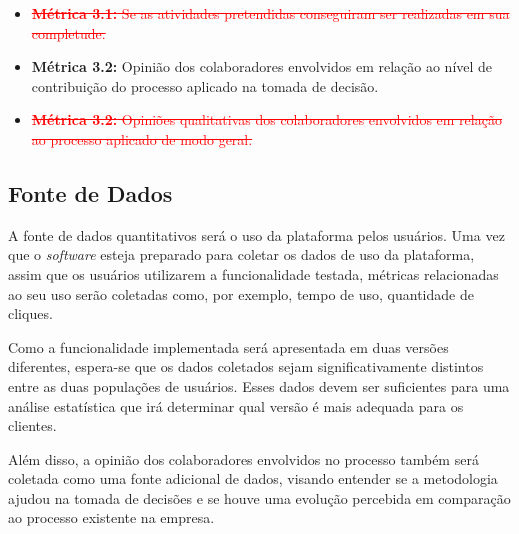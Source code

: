 \begin{itemize}
    \begin{itemize}
        \item\textcolor{red}{\st{\textbf{Métrica 3.1:} Se as atividades pretendidas conseguiram ser realizadas em sua completude.}}
    \end{itemize}

    \begin{itemize}
        \item\textbf{Métrica 3.2:} Opinião dos colaboradores envolvidos em relação ao nível de contribuição do processo aplicado na tomada de decisão.
         
         

        
        
    \end{itemize}

    \begin{itemize}
        \item\textcolor{red}{\st{\textbf{Métrica 3.2:} Opiniões qualitativas dos colaboradores envolvidos em relação ao processo aplicado de modo geral.}}
    \end{itemize}
    
\end{itemize}

\subsection{Fonte de Dados}

A fonte de dados quantitativos será o uso da plataforma pelos usuários. Uma vez que o \textit{software} esteja preparado para coletar os dados de uso da plataforma, assim que os usuários utilizarem a funcionalidade testada, métricas relacionadas ao seu uso serão coletadas como, por exemplo, tempo de uso, quantidade de cliques.

Como a funcionalidade implementada será apresentada em duas versões diferentes, espera-se que os dados coletados sejam significativamente distintos entre as duas populações de usuários. Esses dados devem ser suficientes para uma análise estatística que irá determinar qual versão é mais adequada para os clientes.

Além disso, a opinião dos colaboradores envolvidos no processo também será coletada como uma fonte adicional de dados, visando entender se a metodologia ajudou na tomada de decisões e se houve uma evolução percebida em comparação ao processo existente na empresa.
